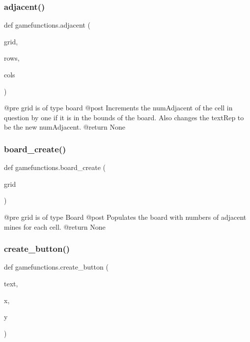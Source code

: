 \subsubsection{\texorpdfstring{adjacent()}{adjacent()}}
{\footnotesize\ttfamily def gamefunctions.\+adjacent (\begin{DoxyParamCaption}\item[{}]{grid,  }\item[{}]{rows,  }\item[{}]{cols }\end{DoxyParamCaption})}

\begin{DoxyVerb}@pre    grid is of type board
    @post   Increments the numAdjacent of the cell in question by one if it is in the bounds of the board. Also changes the textRep to be the new numAdjacent.
    @return None
\end{DoxyVerb}
 \mbox{\label{namespacegamefunctions_a26a89961ef41d92fb61c4703f9c63dca}} 
\subsubsection{\texorpdfstring{board\+\_\+create()}{board\_create()}}
{\footnotesize\ttfamily def gamefunctions.\+board\+\_\+create (\begin{DoxyParamCaption}\item[{}]{grid }\end{DoxyParamCaption})}

\begin{DoxyVerb}@pre    grid is of type Board
    @post   Populates the board with numbers of adjacent mines for each cell.
    @return None
\end{DoxyVerb}
 \mbox{\label{namespacegamefunctions_a60920b30a54df9dfed7de61f17403e07}} 
\subsubsection{\texorpdfstring{create\+\_\+button()}{create\_button()}}
{\footnotesize\ttfamily def gamefunctions.\+create\+\_\+button (\begin{DoxyParamCaption}\item[{}]{text,  }\item[{}]{x,  }\item[{}]{y }\end{DoxyParamCaption})}

